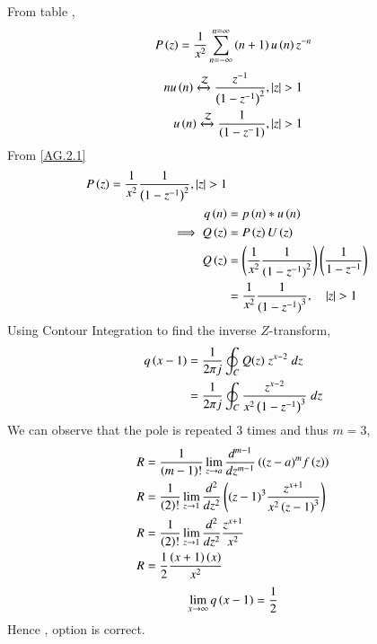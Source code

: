 \documentclass[beamer]{IEEEtran}
\theoremstyle{remark}
\begin{document}
From table ,
\begin{align}
	P\left(z\right)=\frac{1}{x^2}\sum_{n=-\infty}^{n=\infty}\left(n+1\right)u\left(n\right)z^{-n} \label{AG.2.1}
\end{align}
\begin{align}
	n u\left(n\right)\xleftrightarrow{\mathcal{Z}} \frac{z^{-1}}{\left(1-z^{-1}\right)^2} ,   \left\vert z\right\vert >1 \\
   u\left(n\right)\xleftrightarrow{\mathcal{Z}} \frac{1}{\left(1-z^-1\right)} ,   \left\vert z\right\vert >1  
\end{align}
From \eqref{AG.2.1}
\begin{align}
  P\left(z\right)=\frac{1}{x^2}\frac{1}{\left(1-z^{-1}\right)^2} , \left\vert z\right\vert >1\\
	q\left(n\right)&=p\left(n\right)\ast u\left(n\right)\\
	\implies Q\left(z\right)&=P\left(z\right)U\left(z\right)   \\
	 Q\left(z\right)&=\left(\frac{1}{x^2}\frac{1}{({1-z^{-1})}^{2}}\right)\left(\frac{1}{1-z^{-1}}\right)  \\
	 &=\frac{1}{x^2}\frac{1}{({1-z^{-1})}^{3}} ,\quad \left\vert z\right\vert>1
\end{align}
Using Contour Integration to find the inverse $Z$-transform,
\begin{align}
    q\left(x-1\right)&=\frac{1}{2\pi j}\oint_{C}Q(z) \;z^{x-2} \;dz  \\
    &=\frac{1}{2\pi j}\oint_{C}\frac{z^{x-2}}{x^2\left(1-z^{-1}\right)^{3}} \;dz 
\end{align}
We can observe that the pole is repeated $3$ times and thus $m=3$,
\begin{align}
    R&=\frac{1}{\left(m-1\right)!}\lim\limits_{z\to a}\frac{d^{m-1}}{dz^{m-1}}\left({(z-a)}^{m}f\left(z\right)\right) \\
    R&=\frac{1}{\left(2\right)!}\lim\limits_{z\to 1}\frac{d^{2}}{dz^{2}}\left({(z-1)}^{3}\frac{z^{x+1}}{x^2\left(z-1\right)^3}\right) \\
    R&=\frac{1}{\left(2\right)!}\lim\limits_{z\to 1}\frac{d^{2}}{dz^{2}} \frac{z^{x+1}}{x^2} \\
    R&=\frac{1}{2}\frac{\left(x+1\right)\left(x\right)}{x^2} 
\end{align}
\begin{align}
    \lim_{x\to\infty}q\left(x-1\right)=\frac{1}{2}
\end{align}
Hence , option  is correct.
\end{document}
